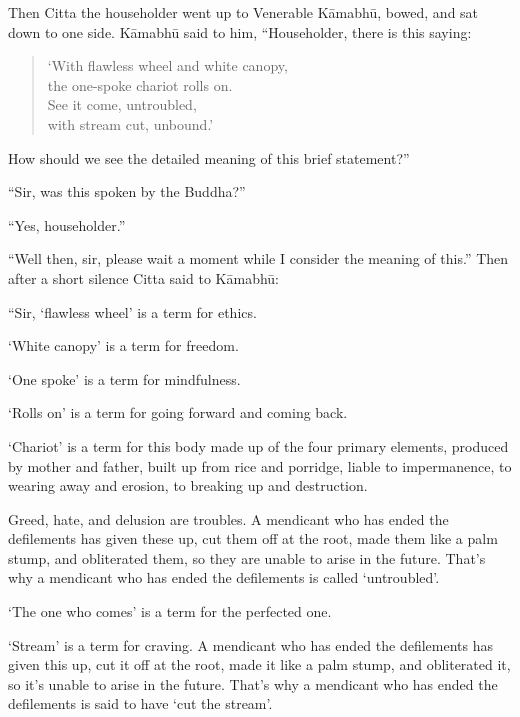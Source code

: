 \documentclass[12pt,openany]{book}%
\begin{document}
Then Citta the householder went up to Venerable \textsanskrit{Kāmabhū}, bowed, and sat down to one side. \textsanskrit{Kāmabhū} said to him, “Householder, there is this saying: 

\begin{verse}%
‘With flawless wheel and white canopy, \\
the one-spoke chariot rolls on. \\
See it come, untroubled, \\
with stream cut, unbound.’ 

%
\end{verse}

How should we see the detailed meaning of this brief statement?” 

“Sir, was this spoken by the Buddha?” 

“Yes, householder.” 

“Well then, sir, please wait a moment while I consider the meaning of this.” Then after a short silence Citta said to \textsanskrit{Kāmabhū}: 

“Sir, ‘flawless wheel’ is a term for ethics. 

‘White canopy’ is a term for freedom. 

‘One spoke’ is a term for mindfulness. 

‘Rolls on’ is a term for going forward and coming back. 

‘Chariot’ is a term for this body made up of the four primary elements, produced by mother and father, built up from rice and porridge, liable to impermanence, to wearing away and erosion, to breaking up and destruction. 

Greed, hate, and delusion are troubles. A mendicant who has ended the defilements has given these up, cut them off at the root, made them like a palm stump, and obliterated them, so they are unable to arise in the future. That’s why a mendicant who has ended the defilements is called ‘untroubled’. 

‘The one who comes’ is a term for the perfected one. 

‘Stream’ is a term for craving. A mendicant who has ended the defilements has given this up, cut it off at the root, made it like a palm stump, and obliterated it, so it’s unable to arise in the future. That’s why a mendicant who has ended the defilements is said to have ‘cut the stream’. 
\end{document}
